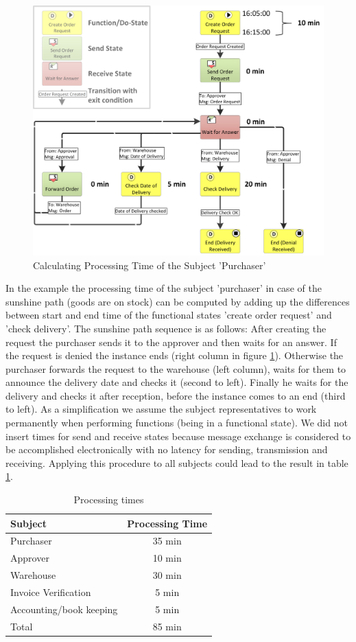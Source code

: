 \begin{figure}[htbp]
	\centering
	\includegraphics[width=0.6\linewidth] {Figures/Chapter5/ActivityBased/CalcPro_NEW.png}
	\caption[Calculating Processing Time of the Subject 'Purchaser']{Calculating Processing Time of the Subject 'Purchaser'}
	\label{fig:CalcPro}
\end{figure}


In the example the processing time of the subject 'purchaser' in case of the sunshine path (goods are on stock) can be computed by adding up the differences between start and end time of the functional states 'create order request' and 'check delivery'. The sunshine path sequence is as follows: After creating the request the purchaser sends it to the approver and then waits for an answer. If the request is denied the instance ends (right column in figure \ref{fig:CalcPro}). Otherwise the purchaser forwards the request to the warehouse (left column), waits for them to announce the delivery date and checks it (second to left). Finally he waits for the delivery and checks it after reception, before the instance comes to an end (third to left). As a simplification we assume the subject representatives to work permanently when performing functions (being in a functional state). We did not insert times for send and receive states because message exchange is considered to be accomplished electronically with no latency for sending, transmission and receiving. Applying this procedure to all subjects could lead to the result in table \ref{tab:procTime}.

\begin{table}[htbp]
	\centering
\begin{tabular}{|p{5.0 cm } |c|}
\hline
	\textbf{Subject} & Processing Time \\
	\hline
	\hline
	Purchaser & 35 min\\
	\hline
	Approver & 10 min \\
	\hline
	Warehouse & 30 min \\
	\hline
	Invoice Verification & 5 min \\
	\hline
	Accounting/book keeping & 5 min \\
	\hline
	Total & 85 min \\
	\hline
\end{tabular}
\caption{Processing times}
\label{tab:procTime}
\end{table}

